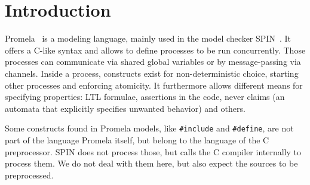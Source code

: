 \section{Introduction}

Promela~\cite{Promela} is a modeling language, mainly used in the model checker SPIN~\cite{Holzmann03}. It offers a C-like syntax and allows to define processes to be run concurrently. Those processes can communicate via shared global variables or by message-passing via channels. Inside a process, constructs exist for non-deterministic choice, starting other processes and enforcing atomicity. It furthermore allows different means for specifying properties:  LTL formulae, assertions in the code, never claims (\ie an automata that explicitly specifies unwanted behavior) and others.

Some constructs found in Promela models, like \texttt{\#include} and \texttt{\#define}, are not part of the language Promela itself, but belong to the language of the C preprocessor. SPIN does not process those, but calls the C compiler internally to process them. We do not deal with them here, but also expect the sources to be preprocessed.


